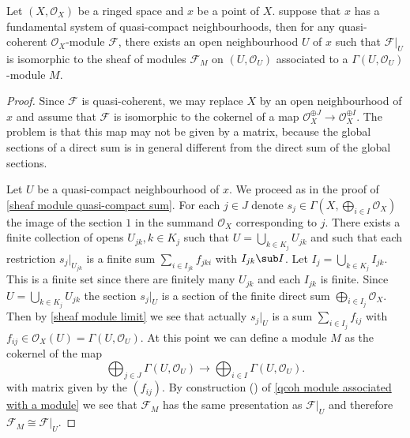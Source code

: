 \begin{proposition}\label{quasi-coherent sheaf locally module on qc nbhd}
Let $(X,\mathscr{O}_X)$ be a ringed space and $x$ be a point of $X$. suppose that $x$ has a fundamental system of quasi-compact neighbourhoods, then for any quasi-coherent $\mathscr{O}_X$-module $\mathscr{F}$, there exists an open neighbourhood $U$ of $x$ such that $\mathscr{F}|_U$ is isomorphic to the sheaf of modules $\mathscr{F}_M$ on $(U,\mathscr{O}_U)$ associated to a $\Gamma(U,\mathscr{O}_U)$-module $M$.
\end{proposition}
\begin{proof}
Since $\mathscr{F}$ is quasi-coherent, we may replace $X$ by an open neighbourhood of $x$ and assume that $\mathscr{F}$ is isomorphic to the cokernel of a map $\mathscr{O}_X^{\oplus J}\to\mathscr{O}_X^{\oplus I}$. The problem is that this map may not be given by a matrix, because the global sections of a direct sum is in general different from the direct sum of the global sections.\par
Let $U$ be a quasi-compact neighbourhood of $x$. We proceed as in the proof of \cref{sheaf module quasi-compact sum}. For each $j\in J$ denote $s_j\in\Gamma(X,\bigoplus_{i\in I}\mathscr{O}_X)$ the image of the section $1$ in the summand $\mathscr{O}_X$ corresponding to $j$. There exists a finite collection of opens $U_{jk},k\in K_j$ such that $U=\bigcup_{k\in K_j}U_{jk}$ and such that each restriction $s_j|_{U_{jk}}$ is a finite sum $\sum_{i\in I_{jk}}f_{jki}$ with $I_{jk}\sub I$. Let $I_j=\bigcup_{k\in K_j}I_{jk}$. This is a finite set since there are finitely many $U_{jk}$ and each $I_{jk}$ is finite. Since $U=\bigcup_{k\in K_j}U_{jk}$ the section $s_j|_U$ is a section of the finite direct sum $\bigoplus_{i\in I_j}\mathscr{O}_X$. Then by \cref{sheaf module limit} we see that actually $s_j|_U$ is a sum $\sum_{i\in I_j}f_{ij}$ with $f_{ij}\in\mathscr{O}_X(U)=\Gamma(U,\mathscr{O}_U)$. At this point we can define a module $M$ as the cokernel of the map
\[\bigoplus_{j\in J}\Gamma(U,\mathscr{O}_U)\to\bigoplus_{i\in I}\Gamma(U,\mathscr{O}_U).\]
with matrix given by the $(f_{ij})$. By construction () of \cref{qcoh module associated with a module} we see that $\mathscr{F}_M$ has the same presentation as $\mathscr{F}|_U$ and therefore $\mathscr{F}_M\cong\mathscr{F}|_U$.
\end{proof}
